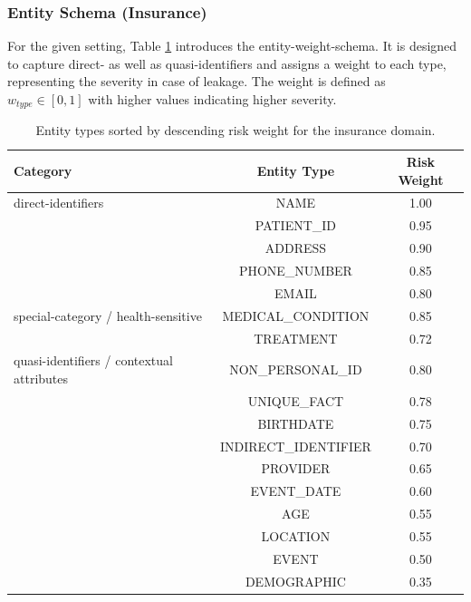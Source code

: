 \subsubsection{Entity Schema (Insurance)}\label{approach-subsubsec:entity_schema}
For the given setting, Table \ref{approach-tab:entity-weight-schema} introduces the entity-weight-schema. It is designed to capture direct- as well as quasi-identifiers and assigns a weight to each type, representing the severity in case of leakage. The weight is defined as $w_{type}\in[0,1]$ with higher values indicating higher severity.

\begin{table}[h!]
    \centering
    \begin{tabular}{p{3.5cm} c c}
        \toprule
        \textbf{Category}  & \textbf{Entity Type} & \textbf{Risk Weight} \\
        \midrule
        direct-identifiers & NAME                 & 1.00                 \\
                           & PATIENT\_ID          & 0.95                 \\
                           & ADDRESS              & 0.90                 \\
                           & PHONE\_NUMBER        & 0.85                 \\
                           & EMAIL                & 0.80                 \\
        \midrule
        special-category / health-sensitive
                           & MEDICAL\_CONDITION   & 0.85                 \\
                           & TREATMENT            & 0.72                 \\
        \midrule
        quasi-identifiers / contextual attributes  
                           & NON\_PERSONAL\_ID    & 0.80                 \\
                           & UNIQUE\_FACT         & 0.78                 \\
                           & BIRTHDATE            & 0.75                 \\
                           & INDIRECT\_IDENTIFIER & 0.70                 \\
                           & PROVIDER             & 0.65                 \\
                           & EVENT\_DATE          & 0.60                 \\
                           & AGE                  & 0.55                 \\
                           & LOCATION             & 0.55                 \\
                           & EVENT                & 0.50                 \\
                           & DEMOGRAPHIC          & 0.35                 \\
        \bottomrule
    \end{tabular}
    \caption{Entity types sorted by descending risk weight for the insurance domain.}
    \label{approach-tab:entity-weight-schema}
\end{table}

